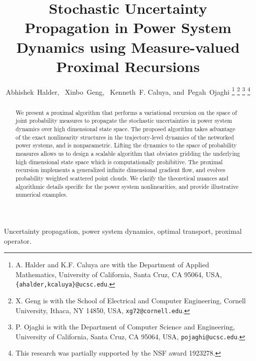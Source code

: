 \documentclass[10pt,twocolumn]{IEEEtran}
\begin{document}
\title{\LARGE \bf Stochastic Uncertainty Propagation in Power System Dynamics using Measure-valued Proximal Recursions}

\author{Abhishek~Halder,~ 
Xinbo~Geng,~
        Kenneth~F. Caluya,
        and~Pegah~Ojaghi%
\thanks{A. Halder and K.F. Caluya are with the Department of Applied Mathematics, University of California, Santa Cruz, CA 95064, USA, {\texttt{\{ahalder,kcaluya\}@ucsc.edu}}.}%
\thanks{X. Geng is with the School of Electrical and Computer Engineering, Cornell University, Ithaca, NY 14850, USA, {\texttt{xg72@cornell.edu}}.} %
\thanks{P. Ojaghi is with the Department of Computer Science and Engineering, University of California, Santa Cruz, CA 95064, USA, {\texttt{pojaghi@ucsc.edu}}.}%
\thanks{This research was partially supported by the NSF award 1923278.}}%

\maketitle

\begin{abstract}
We present a proximal algorithm that performs a variational recursion on the space of joint probability measures to propagate the stochastic uncertainties in power system dynamics over high dimensional state space. The proposed algorithm takes advantage of the exact nonlinearity structures in the trajectory-level dynamics of the networked power systems, and is nonparametric. Lifting the dynamics to the space of probability measures allows us to design a scalable algorithm that obviates gridding the underlying high dimensional state space which is computationally prohibitive. The proximal recursion implements a generalized infinite dimensional gradient flow, and evolves probability weighted scattered point clouds. We clarify the theoretical nuances and algorithmic details specific for the power system nonlinearities, and provide illustrative numerical examples.
\end{abstract}

\begin{IEEEkeywords}
Uncertainty propagation, power system dynamics, optimal transport, proximal operator.
\end{IEEEkeywords}
\end{document}
